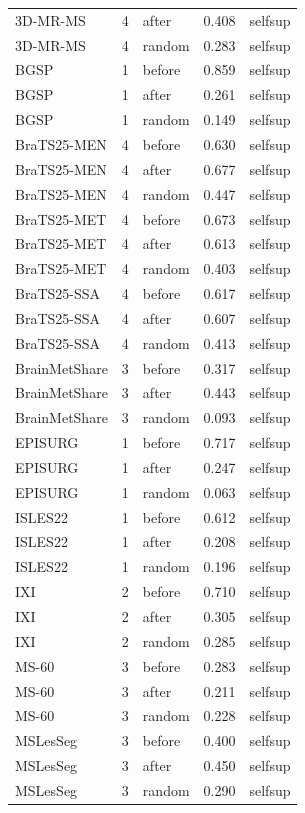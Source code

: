 \begin{tabular}{lrlrl}
3D-MR-MS & 4 & after & 0.408 & selfsup \\
3D-MR-MS & 4 & random & 0.283 & selfsup \\
BGSP & 1 & before & 0.859 & selfsup \\
BGSP & 1 & after & 0.261 & selfsup \\
BGSP & 1 & random & 0.149 & selfsup \\
BraTS25-MEN & 4 & before & 0.630 & selfsup \\
BraTS25-MEN & 4 & after & 0.677 & selfsup \\
BraTS25-MEN & 4 & random & 0.447 & selfsup \\
BraTS25-MET & 4 & before & 0.673 & selfsup \\
BraTS25-MET & 4 & after & 0.613 & selfsup \\
BraTS25-MET & 4 & random & 0.403 & selfsup \\
BraTS25-SSA & 4 & before & 0.617 & selfsup \\
BraTS25-SSA & 4 & after & 0.607 & selfsup \\
BraTS25-SSA & 4 & random & 0.413 & selfsup \\
BrainMetShare & 3 & before & 0.317 & selfsup \\
BrainMetShare & 3 & after & 0.443 & selfsup \\
BrainMetShare & 3 & random & 0.093 & selfsup \\
EPISURG & 1 & before & 0.717 & selfsup \\
EPISURG & 1 & after & 0.247 & selfsup \\
EPISURG & 1 & random & 0.063 & selfsup \\
ISLES22 & 1 & before & 0.612 & selfsup \\
ISLES22 & 1 & after & 0.208 & selfsup \\
ISLES22 & 1 & random & 0.196 & selfsup \\
IXI & 2 & before & 0.710 & selfsup \\
IXI & 2 & after & 0.305 & selfsup \\
IXI & 2 & random & 0.285 & selfsup \\
MS-60 & 3 & before & 0.283 & selfsup \\
MS-60 & 3 & after & 0.211 & selfsup \\
MS-60 & 3 & random & 0.228 & selfsup \\
MSLesSeg & 3 & before & 0.400 & selfsup \\
MSLesSeg & 3 & after & 0.450 & selfsup \\
MSLesSeg & 3 & random & 0.290 & selfsup \\

\end{tabular}
